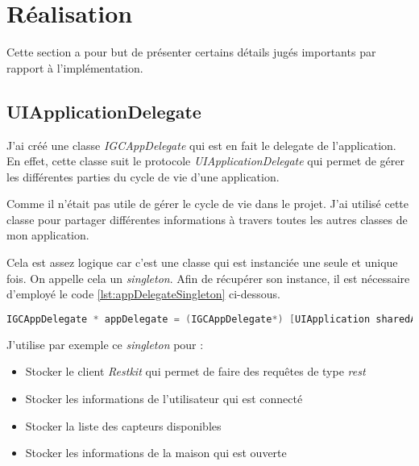 
\section{Réalisation}
Cette section a pour but de présenter certains détails jugés importants par rapport à l'implémentation.

\subsection{UIApplicationDelegate} %
\label{sub:uiapplicationdelegate}

J'ai créé une classe \emph{IGCAppDelegate} qui est en fait le delegate de l'application. En effet, cette classe suit le protocole \emph{UIApplicationDelegate} qui permet de gérer les différentes parties du cycle de vie d'une application.

\medskip 

Comme  il n'était pas utile de gérer le cycle de vie dans le projet. J'ai utilisé cette classe pour partager différentes informations à travers toutes les autres classes de mon application. 

\medskip

Cela est assez logique car c'est une classe qui est instanciée une seule et unique fois. On appelle cela un \emph{\gls{singleton}}. Afin de récupérer son instance, il est nécessaire d'employé le code \ref{lst:appDelegateSingleton} ci-dessous.

\begin{lstlisting}[language={JAVA}, caption={Récuperer l'instance de l'application delegate}, label={lst:appDelegateSingleton}]
IGCAppDelegate * appDelegate = (IGCAppDelegate*) [UIApplication sharedApplication].delegate;
\end{lstlisting}

J'utilise par exemple ce \emph{\gls{singleton}} pour : 

\medskip

\begin{itemize}
	\item Stocker le client \emph{Restkit} qui permet de faire des requêtes de type \emph{\gls{rest}}
	\item Stocker les informations de l'utilisateur qui est connecté
	\item Stocker la liste des capteurs disponibles
	\item Stocker les informations de la maison qui est ouverte
\end{itemize}

